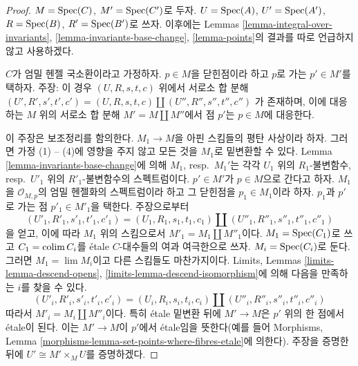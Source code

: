 \begin{proof}
$M = \mathop{\mathrm{Spec}}(C)$, $M' = \mathop{\mathrm{Spec}}(C')$로 두자. $U = \mathop{\mathrm{Spec}}(A)$, $U' = \mathop{\mathrm{Spec}}(A')$,
$R = \mathop{\mathrm{Spec}}(B)$, $R' = \mathop{\mathrm{Spec}}(B')$로 쓰자. 이후에는 Lemmas \ref{lemma-integral-over-invariants},
\ref{lemma-invariants-base-change}, \ref{lemma-points}의 결과를 따로 언급하지 않고 사용하겠다.

\medskip\noindent
$C$가 엄밀 헨젤 국소환이라고 가정하자. $p \in M$을 닫힌점이라 하고 $p$로 가는 $p' \in M'$를 택하자.
주장: 이 경우 $(U, R, s, t, c)$ 위에서 서로소 합 분해
$(U', R', s', t', c') = (U, R, s, t, c) \amalg (U'', R'', s'', t'', c'')$
가 존재하며, 이에 대응하는 $M$ 위의 서로소 합 분해 $M' = M \amalg M''$에서 점 $p'$는 $p \in M$에 대응한다.

\medskip\noindent
이 주장은 보조정리를 함의한다. $M_1 \to M$을 아핀 스킴들의 평탄 사상이라 하자. 그러면 가정 (1) -- (4)에
영향을 주지 않고 모든 것을 $M_1$로 밑변환할 수 있다. Lemma \ref{lemma-invariants-base-change}에 의해
$M_1$, resp.\ $M_1'$는 각각 $U_1$ 위의 $R_1$-불변함수, resp.\ $U'_1$ 위의 $R'_1$-불변함수의 스펙트럼이다.
$p' \in M'$가 $p \in M$으로 간다고 하자. $M_1$을 $\mathcal{O}_{M, p}$의 엄밀 헨젤화의 스펙트럼이라 하고
그 닫힌점을 $p_1 \in M_1$이라 하자. $p_1$과 $p'$로 가는 점 $p'_1 \in M'_1$을 택한다. 주장으로부터
$$
(U'_1, R'_1, s'_1, t'_1, c'_1) =
(U_1, R_1, s_1, t_1, c_1) \amalg
(U''_1, R''_1, s''_1, t''_1, c''_1)
$$
을 얻고, 이에 따라 $M_1$ 위의 스킴으로서 $M'_1 = M_1 \amalg M''_1$이다.
$M_1 = \mathop{\mathrm{Spec}}(C_1)$로 쓰고 $C_1 = \mathop{\mathrm{colim}}\nolimits C_i$를 \'etale $C$-대수들의 여과 여극한으로 쓰자.
$M_i = \mathop{\mathrm{Spec}}(C_i)$로 둔다. 그러면 $M_1 = \lim M_i$이고 다른 스킴들도 마찬가지이다.
Limits, Lemmas \ref{limits-lemma-descend-opens}, \ref{limits-lemma-descend-isomorphism}에 의해 다음을 만족하는 $i$를 찾을 수 있다.
$$
(U'_i, R'_i, s'_i, t'_i, c'_i) =
(U_i, R_i, s_i, t_i, c_i) \amalg
(U''_i, R''_i, s''_i, t''_i, c''_i)
$$
따라서 $M'_i = M_i \amalg M''_i$이다. 특히 \'etale 밑변환 뒤에 $M' \to M$은 $p'$ 위의 한 점에서 \'etale이 된다.
이는 $M' \to M$이 $p'$에서 \'etale임을 뜻한다(예를 들어 Morphisms, Lemma
\ref{morphisms-lemma-set-points-where-fibres-etale}에 의한다). 주장을 증명한 뒤에 $U' \cong M' \times_M U$를 증명하겠다.


\end{proof}

